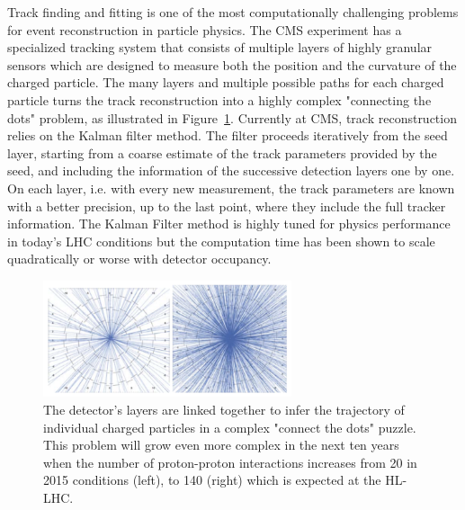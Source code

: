 \documentclass[preprint,12pt]{elsarticle}
\begin{document}
Track finding and fitting is one of the most computationally challenging 
problems for event reconstruction in particle physics.
The CMS experiment has 
a specialized tracking system that consists of multiple layers of highly granular 
sensors which are designed to measure both the position and the curvature of the 
charged particle. The many layers and multiple possible paths for each charged 
particle turns the track reconstruction into a highly complex "connecting the dots" 
problem, as illustrated in Figure~\ref{fig:connectthedots}.
Currently at CMS, track reconstruction relies on the Kalman filter method. 
The filter proceeds iteratively from the seed layer, starting from a coarse estimate of 
the track parameters provided by the seed, and including the
information of the successive detection layers one by one. 
On each layer, i.e. with every new measurement, the track parameters 
are known with a better precision, up to the last point, where they 
include the full tracker information.
The Kalman Filter method is highly tuned for physics performance in today’s LHC 
conditions but the computation time has been shown to scale quadratically or worse with 
detector occupancy\cite{Cerati_2015}. 

\begin{figure}[htbp]
\centering
     \includegraphics[trim=0 0 0 0,clip,width=0.65\textwidth]{ConnectTheDots.png}
     \caption{The detector’s layers are linked together to infer the trajectory of individual charged particles in a complex "connect the dots" puzzle. This problem will grow even more complex in the next ten years when the number of proton-proton interactions increases from 20 in 2015 conditions (left), to 140 (right) which is expected at the HL-LHC.}
     \label{fig:connectthedots}
\end{figure}
\end{document}
